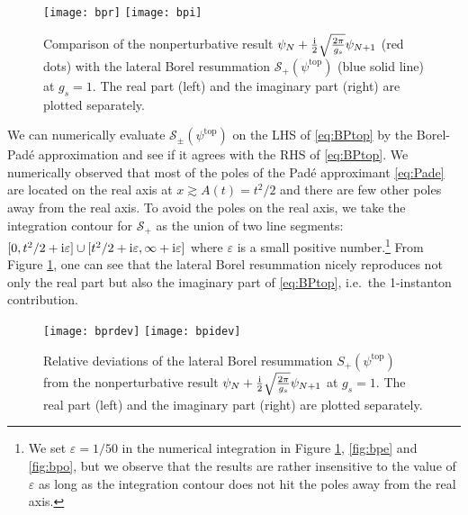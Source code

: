 \documentclass[11pt]{article}
\newcommand{\ri}{{\rm i}}
\renewcommand{\[}{\begin{eqnarray}}
\renewcommand{\]}{\end{eqnarray}}
\newcommand{\Atop}{A}
\begin{document}
%
\begin{figure}[tb]
\begin{center}
\texttt{[image: bpr]}
\hspace{1cm}
\texttt{[image: bpi]}
\end{center}
\vspace{-2ex}
\caption{Comparison of the nonperturbative result
$\psi_N+\frac{\ri}{2}\sqrt{\frac{2\pi}{g_s}}\psi_{N+1}$ (red dots)
with the lateral Borel resummation
$\mathcal{S}_+(\psi^{\text{top}})$ (blue solid line)
at $g_s=1$.
The real part (left) and the imaginary part (right)
are plotted separately.}
\label{fig:bp}
\end{figure}
%
We can numerically evaluate $\mathcal{S}_\pm(\psi^{\text{top}})$ on the LHS of \eqref{eq:BPtop}
by the Borel-Pad\'{e} approximation and see if it agrees with the RHS
of \eqref{eq:BPtop}.
We numerically observed that most of the poles of the Pad\'{e}
approximant \eqref{eq:Pade}
are located on the real axis at $x\gtrsim \Atop(t)=t^2/2$
and there are few other poles away from the real axis.
To avoid the poles on the real axis,
we take the integration contour for $\mathcal{S}_+$ as the union of
two line segments:
$[0,t^2/2+\ri\varepsilon]\cup[t^2/2+\ri\varepsilon,\infty+\ri\varepsilon]$
where $\varepsilon$ is a small positive number.\footnote{We set $\varepsilon=1/50$
in the numerical integration
in Figure \ref{fig:bp}, \ref{fig:bpe} and \ref{fig:bpo}, but
we observe that the results are rather insensitive
to the value of $\varepsilon$ as long as the
integration contour does not hit the poles away from the real axis.}
From Figure \ref{fig:bp}, 
one can see that the lateral Borel resummation
nicely reproduces not only the real part but also
the imaginary part of \eqref{eq:BPtop},
i.e.~the 1-instanton contribution.
%
\begin{figure}[tb]
\vspace{2ex}
\begin{center}
\texttt{[image: bprdev]}
\hspace{1cm}
\texttt{[image: bpidev]}
\end{center}
\vspace{-2ex}
\caption{Relative deviations of
the lateral Borel resummation
$S_+(\psi^{\text{top}})$
from the nonperturbative result
$\psi_N+\frac{\ri}{2}\sqrt{\frac{2\pi}{g_s}}\psi_{N+1}$
at $g_s=1$.
The real part (left) and the imaginary part (right)
are plotted separately.}
\label{fig:bpdev}
\end{figure}
\end{document}
